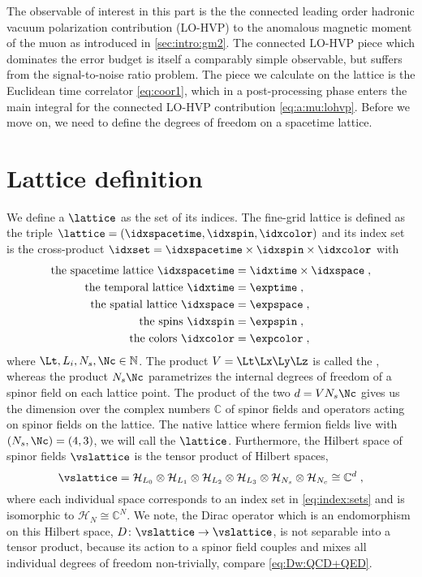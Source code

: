 The observable of interest in this part is the the connected leading order hadronic vacuum polarization contribution (LO-HVP) to the anomalous magnetic moment of the muon as introduced in \cref{sec:intro:gm2}.
The connected LO-HVP piece which dominates the error budget is itself a comparably simple observable, but suffers from the signal-to-noise ratio problem.
The piece we calculate on the lattice is the Euclidean time correlator \cref{eq:coor1}, which in a post-processing phase enters the main integral for the connected LO-HVP contribution \cref{eq:a:mu:lohvp}.
Before we move on, we need to define the degrees of freedom on a spacetime lattice.

\section{Lattice definition}
\label{sec:lattice:definition}

We define a  $\lattice$ as the set of its indices.
The fine-grid lattice is defined as the triple $\lattice = (\idxspacetime, \idxspin, \idxcolor)$ and its index set is the cross-product $\idxset = \idxspacetime \times \idxspin \times \idxcolor$ with
\begin{align}
\begin{aligned}
\text{the spacetime lattice }
    \idxspacetime &= \idxtime \times \idxspace \;, \\
\text{the temporal lattice }
    \idxtime  &= \exptime \;, \\
\text{the spatial lattice }
    \idxspace &= \expspace \;, \\
\text{the spins }
    \idxspin  &= \expspin \;, \\
\text{the colors }
    \idxcolor &= \expcolor \;,
\end{aligned} \label{eq:index:sets}
\end{align}
where $\Lt,L_i,N_s,\Nc \in \mathbb{N}$.
The product $V = \Lt \Lx \Ly \Lz$ is called the , whereas the product $N_s \Nc$ parametrizes the internal degrees of freedom of a spinor field on each lattice point.
The product of the two $d = V N_s \Nc$ gives us the dimension over the complex numbers $\mathbb{C}$ of spinor fields and operators acting on spinor fields on the lattice.
The native lattice where fermion fields live with $(N_s, \Nc) = (4,3)$, we will call the  $\lattice$.
Furthermore, the Hilbert space of spinor fields $\vslattice$ is the tensor product of Hilbert spaces,
\begin{equation}
\vslattice = \mathcal{H}_{L_0} \otimes \mathcal{H}_{L_1} \otimes \mathcal{H}_{L_2} \otimes \mathcal{H}_{L_3} \otimes \mathcal{H}_{N_s} \otimes \mathcal{H}_{N_c} \cong \mathbb{C}^{d} \;,
\end{equation}
where each individual space corresponds to an index set in \cref{eq:index:sets} and is isomorphic to $\mathcal{H}_{N} \cong \mathbb{C}^{N}$.
We note, the Dirac operator which is an endomorphism on this Hilbert space, $D \colon \vslattice \rightarrow \vslattice$, is not separable into a tensor product, because its action to a spinor field couples and mixes all individual degrees of freedom non-trivially, compare \cref{eq:Dw:QCD+QED}.

